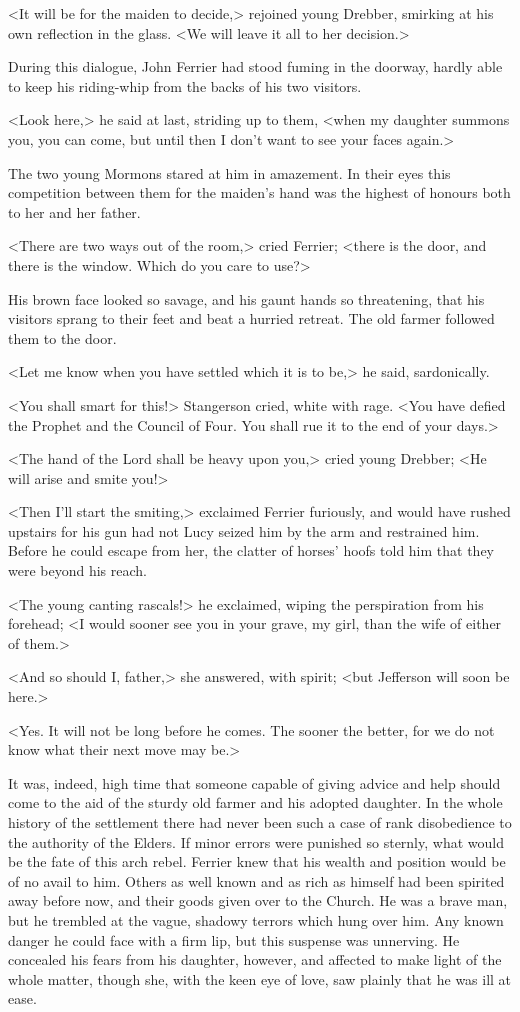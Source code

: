 <It will be for the maiden to decide,> rejoined young Drebber, smirking at his own reflection in the glass. <We will leave it all to her decision.>

During this dialogue, John Ferrier had stood fuming in the doorway, hardly able to keep his riding-whip from the backs of his two visitors.

<Look here,> he said at last, striding up to them, <when my daughter summons you, you can come, but until then I don't want to see your faces again.>

The two young Mormons stared at him in amazement. In their eyes this competition between them for the maiden's hand was the highest of honours both to her and her father.

<There are two ways out of the room,> cried Ferrier; <there is the door, and there is the window. Which do you care to use?>

His brown face looked so savage, and his gaunt hands so threatening, that his visitors sprang to their feet and beat a hurried retreat. The old farmer followed them to the door.

<Let me know when you have settled which it is to be,> he said, sardonically.

<You shall smart for this!> Stangerson cried, white with rage. <You have defied the Prophet and the Council of Four. You shall rue it to the end of your days.>

<The hand of the Lord shall be heavy upon you,> cried young Drebber; <He will arise and smite you!>

<Then I'll start the smiting,> exclaimed Ferrier furiously, and would have rushed upstairs for his gun had not Lucy seized him by the arm and restrained him. Before he could escape from her, the clatter of horses' hoofs told him that they were beyond his reach.

<The young canting rascals!> he exclaimed, wiping the perspiration from his forehead; <I would sooner see you in your grave, my girl, than the wife of either of them.>

<And so should I, father,> she answered, with spirit; <but Jefferson will soon be here.>

<Yes. It will not be long before he comes. The sooner the better, for we do not know what their next move may be.>

It was, indeed, high time that someone capable of giving advice and help should come to the aid of the sturdy old farmer and his adopted daughter. In the whole history of the settlement there had never been such a case of rank disobedience to the authority of the Elders. If minor errors were punished so sternly, what would be the fate of this arch rebel. Ferrier knew that his wealth and position would be of no avail to him. Others as well known and as rich as himself had been spirited away before now, and their goods given over to the Church. He was a brave man, but he trembled at the vague, shadowy terrors which hung over him. Any known danger he could face with a firm lip, but this suspense was unnerving. He concealed his fears from his daughter, however, and affected to make light of the whole matter, though she, with the keen eye of love, saw plainly that he was ill at ease.

